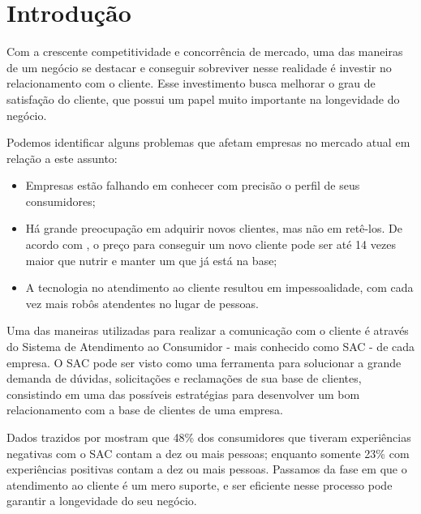 \chapter[Introdução]{Introdução}\label{chap:introducao}

Com a crescente competitividade e concorrência de mercado, uma das maneiras de um negócio se destacar e conseguir sobreviver nesse realidade é investir no relacionamento com o cliente. Esse investimento busca melhorar o grau de satisfação do cliente, que possui um papel muito importante na longevidade do negócio.

Podemos identificar alguns problemas que afetam empresas no mercado atual em relação a este assunto:
\begin{itemize}
\item Empresas estão falhando em conhecer com precisão o perfil de seus consumidores; 
\item Há grande preocupação em adquirir novos clientes, mas não em retê-los. De acordo com \cite{marketingmetrics2015}, o preço para conseguir um novo cliente pode ser até 14 vezes maior que nutrir e manter um que já está na base;
\item A tecnologia no atendimento ao cliente resultou em impessoalidade, com cada vez mais robôs atendentes no lugar de pessoas.
\end{itemize}

Uma das maneiras utilizadas para realizar a comunicação com o cliente é através do Sistema de Atendimento ao Consumidor - mais conhecido como SAC - de cada empresa. O SAC pode ser visto como uma ferramenta para solucionar a grande demanda de dúvidas, solicitações e reclamações de sua base de clientes, consistindo em uma das possíveis estratégias para desenvolver um bom relacionamento com a base de clientes de uma empresa.

Dados trazidos por \cite{hbrdelightcustomer2010} mostram que 48\% dos consumidores que tiveram experiências negativas com o SAC contam a dez ou mais pessoas; enquanto somente 23\% com experiências positivas contam a dez ou mais pessoas. Passamos da fase em que o atendimento ao cliente é um mero suporte, e ser eficiente nesse processo pode garantir a longevidade do seu negócio.

